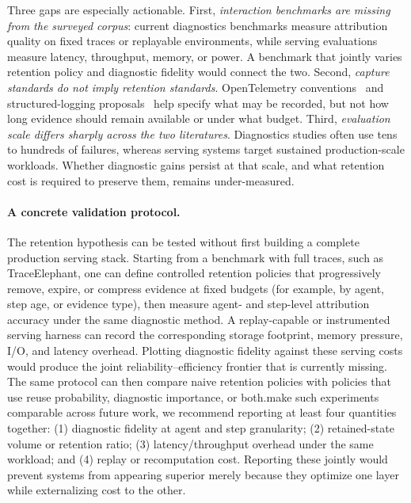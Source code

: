 Three gaps are especially actionable. First, \emph{interaction benchmarks are missing from the surveyed corpus}: current diagnostics benchmarks measure attribution quality on fixed traces or replayable environments, while serving evaluations measure latency, throughput, memory, or power. A benchmark that jointly varies retention policy and diagnostic fidelity would connect the two. Second, \emph{capture standards do not imply retention standards}. OpenTelemetry conventions~\cite{opentelemetry2026} and structured-logging proposals~\cite{agenttrace2026} help specify what may be recorded, but not how long evidence should remain available or under what budget. Third, \emph{evaluation scale differs sharply across the two literatures}. Diagnostics studies often use tens to hundreds of failures, whereas serving systems target sustained production-scale workloads. Whether diagnostic gains persist at that scale, and what retention cost is required to preserve them, remains under-measured.

\paragraph*{A concrete validation protocol.}
The retention hypothesis can be tested without first building a complete production serving stack. Starting from a benchmark with full traces, such as TraceElephant, one can define controlled retention policies that progressively remove, expire, or compress evidence at fixed budgets (for example, by agent, step age, or evidence type), then measure agent- and step-level attribution accuracy under the same diagnostic method. A replay-capable or instrumented serving harness can record the corresponding storage footprint, memory pressure, I/O, and latency overhead. Plotting diagnostic fidelity against these serving costs would produce the joint reliability--efficiency frontier that is currently missing. The same protocol can then compare naive retention policies with policies that use reuse probability, diagnostic importance, or both.\n\nTo make such experiments comparable across future work, we recommend reporting at least four quantities together: (1) diagnostic fidelity at agent and step granularity; (2) retained-state volume or retention ratio; (3) latency/throughput overhead under the same workload; and (4) replay or recomputation cost. Reporting these jointly would prevent systems from appearing superior merely because they optimize one layer while externalizing cost to the other.

